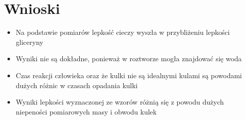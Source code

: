 \documentclass{article}
\begin{document}



\section{Wnioski}
\begin{itemize}
    \item Na podstawie pomiarów lepkość cieczy wyszła w przybliżeniu lepkości gliceryny
    \item Wyniki nie są dokładne, ponieważ w roztworze mogła znajdować się woda
    \item Czas reakcji człowieka oraz że kulki nie są idealnymi kulami są powodami dużych różnic w czasach opadania kulki
    \item Wyniki lepkości wyznaczonej ze wzorów różnią się z powodu dużych niepeności pomiarowych masy i obwodu kulek
\end{itemize}
\end{document}
